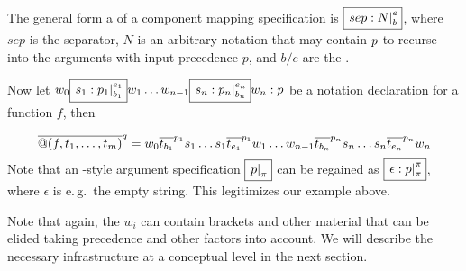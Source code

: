 The general form a of a component mapping specification is $\fbox{\ensuremath{\left.sep:N\right|_{b}^{e}}}$, where $sep$
is the separator, $N$ is an arbitrary notation that may contain $p$ to recurse into
the arguments with input precedence $p$, and $b/e$ are the {}.

Now let $w_0\fbox{\ensuremath{\left.s_1:p_1\right|_{b_1}^{e_1}}}w_1\ldots
w_{n-1}\fbox{\ensuremath{\left.s_n:p_n\right|_{b_n}^{e_n}}}w_n:p$ be a notation declaration for a function
$f$, then

  \[\overline{@(f,t_1,\ldots,t_m)}^{q}=
        w_0\overline{t_{b_1}}^{p_1}s_1\ldots s_1\overline{t_{e_1}}^{p_1}w_1\ldots
        w_{n-1}\overline{t_{b_n}}^{p_n}s_n\ldots s_n\overline{t_{e_n}}^{p_n}w_n
  \]
  Note that an {\isabelle}-style argument specification $\fbox{\ensuremath{\left.p\right|_{\pi}}}$ can be regained as
  $\fbox{\ensuremath{\left.\epsilon:p\right|_{\pi}^{\pi}}}$, where $\epsilon$ is e.\,g.\  the empty
  string. This legitimizes our example above.

  Note that again, the $w_i$ can contain brackets and other material that can be elided
  taking precedence and other factors into account. We will describe the necessary
  infrastructure at a conceptual level in the next section. 



